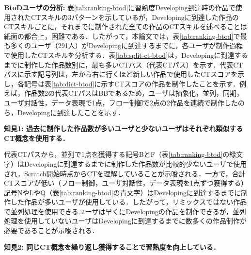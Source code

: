 \documentclass[submit,ses,noauthor]{ipsj}
\begin{document}
\noindent\textbf{BtoDユーザの分析:} 表\ref{tab:ranking-btod}に習熟度Developing到達時の作品で使用されたCTスキルの3パターンを示しているが，Developingに到達した作品のCTスキルごとに，それまでに制作された全ての作品のCTスキルを述べることは紙面の都合上，困難である．したがって，本論文では，表\ref{tab:ranking-btod}で最も多くのユーザ（291人）がDevelopingに到達するまでに，各ユーザが制作過程で使用したCTスキルを分析する．表\ref{tab:split-ct-btod}は，Developingに到達するまでに制作した作品数別に，最も多いCTパス（代表CTパス）を示す．代表CTパスに示す記号列は，左から右に行くほど新しい作品で使用したCTスコアを示し，各記号は表\ref{tab:dict-btod}に示すCTスコアの作品を制作したことを示す．例えば，作品数2の代表CTパスはBBであるため，ユーザは抽象化，並列，同期，ユーザ対話性，データ表現で1点，フロー制御で2点の2作品を連続で制作したのち，Developingに到達したことを示す．




\noindent\textbf{知見1: 過去に制作した作品数が多いユーザと少ないユーザはそれぞれ類似するCT概念を使用する．}

代表CTパスから，並列で1点を獲得する記号BとF（表\ref{tab:ranking-btod}の緑文字）はDevelopingに到達するまでに制作した作品数が比較的少ないユーザで使用され，Scratch開始時点からCTを理解していることが示唆される．一方で，合計CTスコアが低い（フロー制御，ユーザ対話性，データ表現を1点ずつ獲得する）記号NやLやQ（表\ref{tab:ranking-btod}の青文字）はDevelopingに到達するまでに制作した作品が多いユーザが使用している．したがって，リミックスではない作品で並列処理を使用できるユーザは早くにDevelopingの作品を制作できるが，並列処理を使用していないユーザはDevelopingに到達するまでに数多くの作品制作が必要であることが示唆される．

\noindent\textbf{知見2: 同じCT概念を繰り返し獲得することで習熟度を向上している．}
\end{document}
